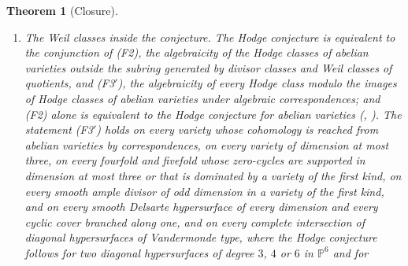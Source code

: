 \documentclass[11pt,reqno]{amsart}
\theoremstyle{plain}
\newtheorem{theorem}{Theorem}[section]
\theoremstyle{definition}
\theoremstyle{remark}
\newcommand{\PP}{\mathbb{P}}
\begin{document}
\begin{theorem}[Closure]
\begin{enumerate}[label=\textup{(\roman*)},leftmargin=2.8em,itemsep=4pt]
\begin{enumerate}[label=\textup{(\alph*)},nosep,leftmargin=2.2em]
    one whose ideal sheaf is presented by two bundles
    with classes in the subring generated by line bundles unless
    $d\equiv15,23\pmod{24}$ (\cite[Corollary~4.68]{paperII},
    \cite[Corollary~4.84]{paperII});
  \item a representative of the Weil $K$-theory class that is a locally free
    sheaf on a smooth germ of codimension at least two of its support, or
    whose support has codimension at least $n$ (\cite[Theorem~2.5]{paperII},
    \cite[Theorem~2.13]{paperII});
  \item at a quartic CM field, a complex with secant character that is
    locally free on a smooth curve at some point, in particular the explicit
    pair of \cite[Example~11.2.7]{Mar25c} (\cite[Theorem~5.28]{paperII},
    \cite[Corollary~5.30]{paperII});
  \item a convolution of fewer than $2n$ line bundles with nondegenerate
    differences (\cite[Theorem~4.26]{paperII}); on $E_{0}^{6}$, every convolution
    of the Weil pieces with three multiples of the polarisation, and on
    $E_{0}^{8}$ every one whose pieces have their shifts within six
    consecutive values (\cite[Theorem~4.35]{paperII}, \cite[Corollary~4.48]{paperII}).
  \end{enumerate}
\item \enlargethispage{4pt}\emph{The Weil classes inside the conjecture.} The Hodge conjecture is
  equivalent to the conjunction of \textup{(F2)}, the algebraicity of the
  Hodge classes of abelian varieties outside the subring generated by divisor
  classes and Weil classes of quotients, and \textup{(F3$'$)}, the
  algebraicity of every Hodge class modulo the images of Hodge classes of
  abelian varieties under algebraic correspondences; and \textup{(F2)} alone
  is equivalent to the Hodge conjecture for abelian varieties
  (, ). The statement \textup{(F3$'$)}
  holds on every variety whose cohomology is reached from abelian varieties by
  correspondences, on every variety of dimension at most three, on every
  fourfold and fivefold whose zero-cycles are supported in dimension at most
  three or that is dominated by a variety of the first kind, on every smooth
  ample divisor of odd dimension in a variety of the first kind, and on every
  smooth Delsarte hypersurface of every dimension and every cyclic cover
  branched along one, and on every complete intersection of diagonal
  hypersurfaces of Vandermonde type, where the Hodge conjecture follows for
  two diagonal hypersurfaces of degree $3$, $4$ or $6$ in $\PP^{6}$ and for

\end{enumerate}
\end{theorem}
\end{document}
